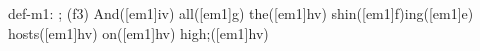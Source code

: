 def-m1: \grealign;
(f3) And([em1]iv) all([em1]g) the([em1]hv) shin([em1]f)ing([em1]e) hosts([em1]hv) on([em1]hv) high;([em1]hv)